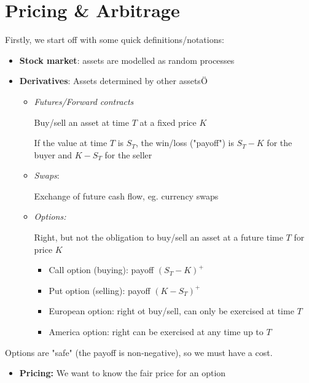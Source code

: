 \section{Pricing \& Arbitrage}
\noindent Firstly, we start off with some quick definitions/notations:\par
\begin{itemize}
  \item\textbf{Stock market}: assets are modelled as random processes
  \item\textbf{Derivatives}: Assets determined by other assetsÖ
    \begin{itemize}
      \item\textit{Futures/Forward contracts}\par
        \noindent Buy/sell an asset at time $T$ at a fixed price $K$\par
        \noindent If the value at time $T$ is $S_T$, the win/loss ("payoff") is $S_T-K$ for the buyer and $K-S_T$ for the seller
        \par\bigskip
      \item\textit{Swaps}:\par
        \noindent Exchange of future cash flow, eg. currency swaps
        \par\bigskip
      \item\textit{Options:}\par
        \noindent Right, but not the obligation to buy/sell an asset at a future time $T$ for price $K$
        \par\bigskip
        \begin{itemize}
          \item Call option (buying): payoff $(S_T-K)^+$
          \item Put option (selling): payoff $(K-S_T)^+$
          \item European option: right ot buy/sell, can only be exercised at time $T$
          \item America option: right can be exercised at any time up to $T$
        \end{itemize}
    \end{itemize}
\end{itemize}
\par\bigskip
\noindent Options are "safe" (the payoff is non-negative), so we must have a cost.\par
\begin{itemize}
  \item \textbf{Pricing:} We want to know the fair price for an option
\end{itemize}
